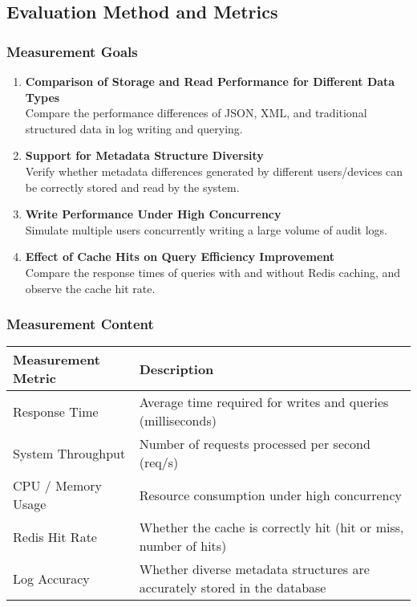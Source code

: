 \documentclass{article}
\begin{document}
\subsection{Evaluation Method and Metrics}

\subsubsection{Measurement Goals}

\begin{enumerate}
    \item \textbf{Comparison of Storage and Read Performance for Different Data Types} \\
    Compare the performance differences of JSON, XML, and traditional structured data in log writing and querying.
    \item \textbf{Support for Metadata Structure Diversity} \\
    Verify whether metadata differences generated by different users/devices can be correctly stored and read by the system.
    \item \textbf{Write Performance Under High Concurrency} \\
    Simulate multiple users concurrently writing a large volume of audit logs.
    \item \textbf{Effect of Cache Hits on Query Efficiency Improvement} \\
    Compare the response times of queries with and without Redis caching, and observe the cache hit rate.
\end{enumerate}

\subsubsection{Measurement Content}

\begin{tabular}{|l|l|}
\hline
\textbf{Measurement Metric} & \textbf{Description} \\
\hline
Response Time & Average time required for writes and queries (milliseconds) \\
System Throughput & Number of requests processed per second (req/s) \\
CPU / Memory Usage & Resource consumption under high concurrency \\
Redis Hit Rate & Whether the cache is correctly hit (hit or miss, number of hits) \\
Log Accuracy & Whether diverse metadata structures are accurately stored in the database \\
\hline
\end{tabular}
\end{document}
